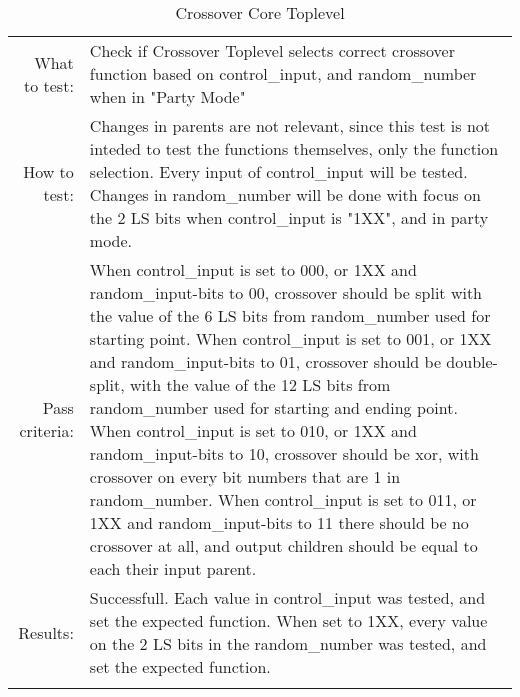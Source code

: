 \begin{table}[H]
  \begin{tabular}{r | p{8cm}}
    \noalign{\smallskip}\hline\noalign{\smallskip}
    
    What to test:  & Check if Crossover Toplevel selects correct crossover function
                     based on control\_input, and random\_number when in "Party Mode"\\

    \noalign{\smallskip}\hline\noalign{\smallskip}

    How to test:   &    Changes in parents are not relevant, since this test is not 
                        inteded to test the functions themselves, only the function 
                        selection.
                        Every input of control\_input will be tested.
                        Changes in random\_number will be done with focus on the 2 LS 
                        bits when control\_input is "1XX", and in party mode.
                        \\
                      
    \noalign{\smallskip}\hline\noalign{\smallskip}

    Pass criteria: &    When control\_input is set to 000, or 1XX and random\_input-bits 
                        to 00, crossover should be split with the value of the 6 LS bits 
                        from random\_number used for starting point.
                        When control\_input is set to 001, or 1XX and random\_input-bits 
                        to 01, crossover should be double-split, with the value of the 
                        12 LS bits from random\_number used for starting and ending 
                        point.
                        When control\_input is set to 010, or 1XX and random\_input-bits 
                        to 10, crossover should be xor, with crossover on every bit 
                        numbers that are 1 in random\_number.
                        When control\_input is set to 011, or 1XX and random\_input-bits 
                        to 11 there should be no crossover at all, and output children 
                        should be equal to each their input parent.
                        \\
    \noalign{\smallskip}\hline\noalign{\smallskip}
    
    Results: &      Successfull. 
                    Each value in control\_input was tested, and set the expected 
                    function. When set to 1XX, every value on the 2 LS bits in the 
                    random\_number was tested, and set the expected function.
                    \\
   \noalign{\smallskip}\hline\noalign{\smallskip}
  
  
  
  \end{tabular}
  \caption{Crossover Core Toplevel}
  \label{testing:components:genetic_pipeline:crossover_core_toplevel}
\end{table}
